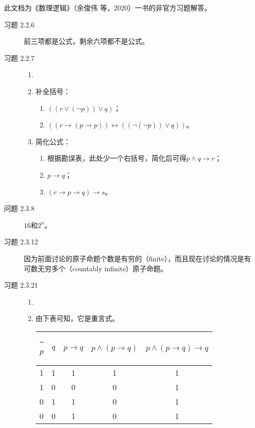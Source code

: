 \documentclass[punct=custom/kaiming,fontset=none]{ctexart}
\title{\Large\bfseries\titleContent}
\title{\bfseries\titleContent}
\author{\authorContent}
\makeatletter
\def\hhline{%
  \noalign{\ifnum0=`}\fi\hrule \@height 2\arrayrulewidth \futurelet
   \reserved@a\@xhline}
\theoremstyle{remark}
\makeatother
\begin{document}
\maketitle

此文档为《数理逻辑》（余俊伟 等，2020）一书的非官方习题解答。

\begin{description}
\item[习题 2.2.6] 前三项都是公式，剩余六项都不是公式。
\item[习题 2.2.7]
  \begin{enumerate}
  \item[]
  \item 补全括号：
    \begin{enumerate}
    \item \(((r \vee (\neg p)) \vee q)\)；
    \item \(((r \to (p \to p)) \leftrightarrow ((\neg(\neg p)) \vee q))\)。
    \end{enumerate}
  \item 简化公式：
    \begin{enumerate}
    \item 根据勘误表，此处少一个右括号，简化后可得\(p \wedge q \to r\)；
    \item \(p \to q\)；
    \item \((r \to p \to q) \to s\)。
    \end{enumerate}
  \end{enumerate}
\item[问题 2.3.8] \(16\)和\(2^n\)。
\item[习题 2.3.12] 因为前面讨论的原子命题个数是有穷的（finite），而且现在讨论的情况是有可数无穷多个（countably infinite）原子命题。
\item[习题 2.3.21]
  \begin{enumerate}
  \item[]
  \item 由下表可知，它是重言式。
    \begin{table}[H]
      \centering
      \begin{tabular}[t]{ccccc}
        \hhline
        \(p\) & \(q\) & \(p \to q\) & \(p \land (p \to q)\) & \(p \land (p \to q) \to q\) \\
        \hline
        1 & 1 & 1 & 1 & 1 \\
        1 & 0 & 0 & 0 & 1 \\
        0 & 1 & 1 & 0 & 1 \\
        0 & 0 & 1 & 0 & 1 \\
        \hline

\end{tabular}
\end{table}
\end{enumerate}
\end{description}
\end{document}
